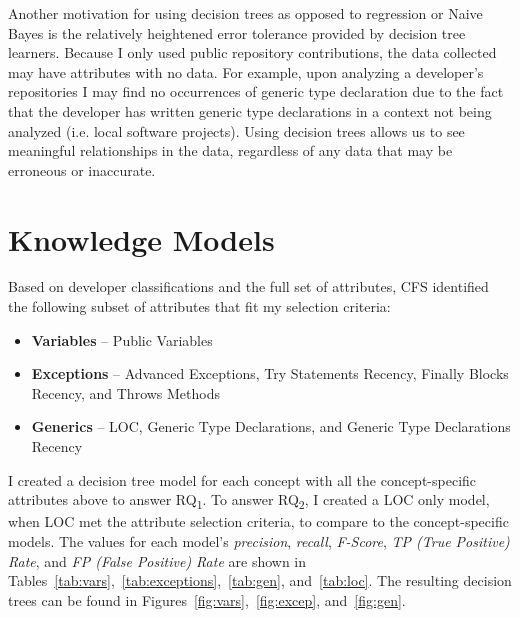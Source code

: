 Another motivation for using decision trees as opposed to regression or Naive Bayes is the relatively heightened error tolerance provided by decision tree learners. Because I only used public repository contributions, the data collected may have attributes with no data. For example, upon analyzing a developer's repositories I may find no occurrences of generic type declaration due to the fact that the developer has written generic type declarations in a context not being analyzed (i.e. local software projects). Using decision trees allows us to see meaningful relationships in the data, regardless of any data that may be erroneous or inaccurate.

\section{Knowledge Models}\label{sec:eval}

Based on developer classifications and the full set of attributes, CFS identified the following subset of attributes that fit my selection criteria:
\begin{itemize}
    \item \textbf{Variables} -- Public Variables
    \item \textbf{Exceptions} -- Advanced Exceptions, Try Statements Recency, Finally Blocks Recency, and Throws Methods
	\item \textbf{Generics} -- LOC, Generic Type Declarations, and Generic Type Declarations Recency
\end{itemize}

I created a decision tree model for each concept with all the concept-specific attributes above to answer RQ\textsubscript{1}. To answer RQ\textsubscript{2}, I created a LOC only model, when LOC met the attribute selection criteria, to compare to the concept-specific models.
The values for each model's \emph{precision}, \emph{recall}, \emph{F-Score}, \emph{TP (True Positive) Rate}, and \emph{FP (False Positive) Rate} are shown in Tables~\ref{tab:vars},~\ref{tab:exceptions},~\ref{tab:gen}, and~\ref{tab:loc}. The resulting decision trees can be found in Figures~\ref{fig:vars},~\ref{fig:excep}, and~\ref{fig:gen}.

